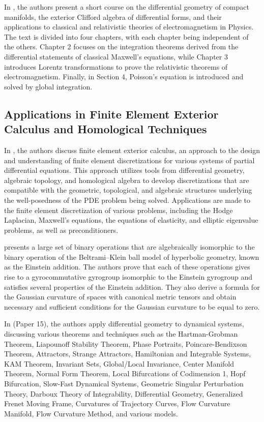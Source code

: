 \documentclass{article}
\begin{document}
In \cite{Catsigeras2013DifferentialGA}, the authors present a short course on the differential geometry of compact manifolds, the exterior Clifford algebra of differential forms, and their applications to classical and relativistic theories of electromagnetism in Physics. The text is divided into four chapters, with each chapter being independent of the others. Chapter 2 focuses on the integration theorems derived from the differential statements of classical Maxwell's equations, while Chapter 3 introduces Lorentz transformations to prove the relativistic theorems of electromagnetism. Finally, in Section 4, Poisson's equation is introduced and solved by global integration.

\subsection{Applications in Finite Element Exterior Calculus and Homological Techniques}

In \cite{Arnold2006FiniteEE}, the authors discuss finite element exterior calculus, an approach to the design and understanding of finite element discretizations for various systems of partial differential equations. This approach utilizes tools from differential geometry, algebraic topology, and homological algebra to develop discretizations that are compatible with the geometric, topological, and algebraic structures underlying the well-posedness of the PDE problem being solved. Applications are made to the finite element discretization of various problems, including the Hodge Laplacian, Maxwell's equations, the equations of elasticity, and elliptic eigenvalue problems, as well as preconditioners.

\cite{Barabanov2020DifferentialGA} presents a large set of binary operations that are algebraically isomorphic to the binary operation of the Beltrami–Klein ball model of hyperbolic geometry, known as the Einstein addition. The authors prove that each of these operations gives rise to a gyrocommutative gyrogroup isomorphic to the Einstein gyrogroup and satisfies several properties of the Einstein addition. They also derive a formula for the Gaussian curvature of spaces with canonical metric tensors and obtain necessary and sufficient conditions for the Gaussian curvature to be equal to zero.

In (Paper 15), the authors apply differential geometry to dynamical systems, discussing various theorems and techniques such as the Hartman-Grobman Theorem, Liapounoff Stability Theorem, Phase Portraits, Poincare-Bendixson Theorem, Attractors, Strange Attractors, Hamiltonian and Integrable Systems, KAM Theorem, Invariant Sets, Global/Local Invariance, Center Manifold Theorem, Normal Form Theorem, Local Bifurcations of Codimension 1, Hopf Bifurcation, Slow-Fast Dynamical Systems, Geometric Singular Perturbation Theory, Darboux Theory of Integrability, Differential Geometry, Generalized Frenet Moving Frame, Curvatures of Trajectory Curves, Flow Curvature Manifold, Flow Curvature Method, and various models.
\end{document}
